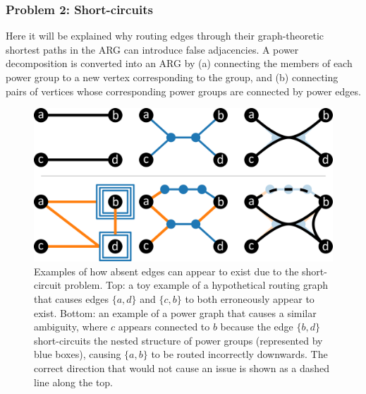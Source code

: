 \subsubsection{Problem 2: Short-circuits}
\label{sec:short_circuits}
Here it will be explained why routing edges through their graph-theoretic shortest paths in the ARG can introduce false adjacencies.
A power decomposition is converted into an ARG by (a) connecting the members of each power group to a new vertex corresponding to the group, and (b) connecting pairs of vertices whose corresponding power groups are connected by power edges.
\begin{figure}
  \centering
  \includegraphics[width=.8\linewidth]{power/shortcircuit.pdf}
  \caption[Examples of the short-circuit problem]{Examples of how absent edges can appear to exist due to the short-circuit problem.
  Top: a toy example of a hypothetical routing graph that causes edges $\{a,d\}$ and $\{c,b\}$ to both erroneously appear to exist.
  Bottom: an example of a power graph that causes a similar ambiguity, where $c$ appears connected to $b$ because the edge $\{b,d\}$ short-circuits the nested structure of power groups (represented by blue boxes), causing $\{a,b\}$ to be routed incorrectly downwards.
  The correct direction that would not cause an issue is shown as a dashed line along the top.
  }
  \label{fig:overlap}
\end{figure}

